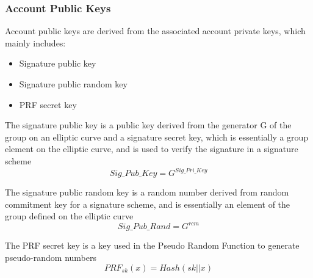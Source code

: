 \subsubsection{Account Public Keys}\label{section: account-public-keys}

Account public keys are derived from the associated account private keys, which mainly includes:

\begin{itemize}
    \item Signature public key
    \item Signature public random key
    \item PRF secret key
\end{itemize}

The signature public key is a public key derived from the generator G of the group on an elliptic curve and a signature secret key, which is essentially a group element on the elliptic curve, and is used to verify the signature in a signature scheme
$$Sig\_Pub\_Key = G^{Sig\_Pri\_Key}$$

The signature public random key is a random number derived from random commitment key for a signature scheme, and is essentially an element of the group defined on the elliptic curve
$$Sig\_Pub\_Rand = G^{rcm}$$

The PRF secret key is a key used in the Pseudo Random Function to generate pseudo-random numbers
$$PRF_{sk}(x) = Hash(sk||x)$$